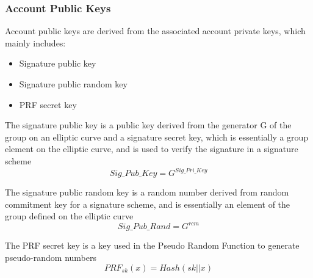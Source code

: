 \subsubsection{Account Public Keys}\label{section: account-public-keys}

Account public keys are derived from the associated account private keys, which mainly includes:

\begin{itemize}
    \item Signature public key
    \item Signature public random key
    \item PRF secret key
\end{itemize}

The signature public key is a public key derived from the generator G of the group on an elliptic curve and a signature secret key, which is essentially a group element on the elliptic curve, and is used to verify the signature in a signature scheme
$$Sig\_Pub\_Key = G^{Sig\_Pri\_Key}$$

The signature public random key is a random number derived from random commitment key for a signature scheme, and is essentially an element of the group defined on the elliptic curve
$$Sig\_Pub\_Rand = G^{rcm}$$

The PRF secret key is a key used in the Pseudo Random Function to generate pseudo-random numbers
$$PRF_{sk}(x) = Hash(sk||x)$$